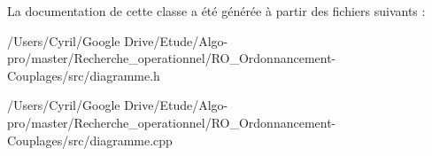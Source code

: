 La documentation de cette classe a été générée à partir des fichiers suivants \-:\begin{DoxyCompactItemize}
\item 
/\-Users/\-Cyril/\-Google Drive/\-Etude/\-Algo-\/pro/master/\-Recherche\-\_\-operationnel/\-R\-O\-\_\-\-Ordonnancement-\/\-Couplages/src/diagramme.\-h\item 
/\-Users/\-Cyril/\-Google Drive/\-Etude/\-Algo-\/pro/master/\-Recherche\-\_\-operationnel/\-R\-O\-\_\-\-Ordonnancement-\/\-Couplages/src/diagramme.\-cpp\end{DoxyCompactItemize}
